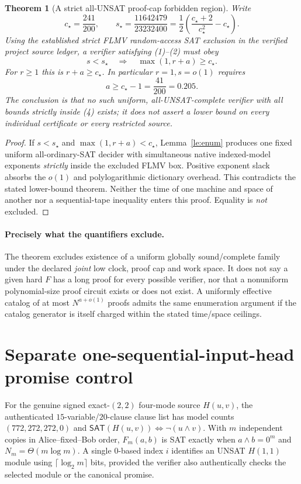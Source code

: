 \documentclass[11pt]{article}
\newtheorem{theorem}{Theorem}
\newcommand{\SAT}{\mathsf{SAT}}
\begin{document}
\begin{theorem}[A strict all-UNSAT proof-cap forbidden region]
\label{th:flmv}
Write
\[
 c_\star=\frac{241}{200},\qquad
 s_\star=\frac{11642479}{23232400}
   =\frac12\left(\frac{c_\star+2}{c_\star^2}-c_\star\right).
\]
Using the established strict FLMV random-access SAT exclusion in
the verified project source ledger, a verifier satisfying
(1)--(2) must obey
\[
 \boxed{\ s<s_\star\quad\Longrightarrow\quad
       \max(1,r+a)\ge c_\star. \ }                    \tag{4}
\]
For $r\ge1$ this is $r+a\ge c_\star$. In particular
$r=1,s=o(1)$ requires
\[
 \boxed{a\ge c_\star-1=\frac{41}{200}=0.205.}          \tag{5}
\]
The conclusion is that \emph{no such uniform, all-UNSAT-complete
verifier with all bounds strictly inside (4) exists}; it does not
assert a lower bound on every individual certificate or every
restricted source.
\end{theorem}
\begin{proof}
If $s<s_\star$ and $\max(1,r+a)<c_\star$, Lemma~\ref{le:enum}
produces one fixed uniform all-ordinary-SAT decider with
simultaneous native indexed-model exponents \emph{strictly} inside
the excluded FLMV box. Positive exponent slack absorbs
the $o(1)$ and polylogarithmic dictionary overhead.
This contradicts the stated lower-bound theorem. Neither the
time of one machine and space of another nor a sequential-tape
inequality enters this proof. Equality is \emph{not} excluded.
\end{proof}

\paragraph{Precisely what the quantifiers exclude.}
The theorem excludes existence of a uniform globally sound/complete
family under the declared \emph{joint} low clock, proof cap and work
space. It does not say a given hard $F$ has a long proof for
every possible verifier, nor that a nonuniform polynomial-size
proof circuit exists or does not exist. A uniformly effective
catalog of at most $N^{a+o(1)}$ proofs admits the same enumeration
argument if the catalog generator is itself charged within the
stated time/space ceilings.

\section{Separate one-sequential-input-head promise control}
For the genuine signed exact-$(2,2)$ four-mode source $H(u,v)$,
the authenticated $15$-variable/$20$-clause clause list has
model counts $(772,272,272,0)$ and
$\SAT(H(u,v))\Longleftrightarrow\neg(u\land v)$.
With $m$ independent copies in Alice--fixed--Bob order,
$F_m(a,b)$ is SAT exactly when $a\land b=0^m$ and
$N_m=\Theta(m\log m)$.
A single $0$-based index $i$ identifies an UNSAT
$H(1,1)$ module using $\lceil\log_2m\rceil$ bits,
provided the verifier also authentically checks the
selected module or the canonical promise.
\end{document}
